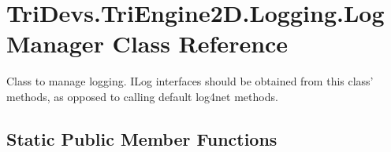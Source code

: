 \hypertarget{class_tri_devs_1_1_tri_engine2_d_1_1_logging_1_1_log_manager}{\section{Tri\-Devs.\-Tri\-Engine2\-D.\-Logging.\-Log\-Manager Class Reference}
\label{class_tri_devs_1_1_tri_engine2_d_1_1_logging_1_1_log_manager}
}


Class to manage logging. I\-Log interfaces should be obtained from this class' methods, as opposed to calling default log4net methods.  


\subsection*{Static Public Member Functions}
